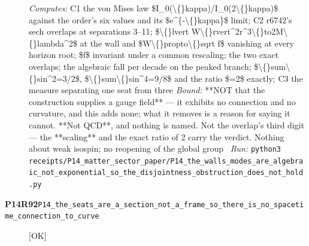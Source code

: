 \begin{description}
\emph{Computes:} C1 the von Mises law \$I\_0(\textbackslash\{\}kappa)/I\_0(2\textbackslash\{\}kappa)\$ against the order's six values and its \$e\textasciicircum{}\{-\textbackslash\{\}kappa\}\$ limit; C2 r6742's sech overlaps at separations 3--11; \$\textbackslash\{\}lvert W\textbackslash\{\}rvert\textasciicircum{}2r\textasciicircum{}3\textbackslash\{\}to2M\textbackslash\{\}lambda\textasciicircum{}2\$ at the wall and \$W\textbackslash\{\}propto\textbackslash\{\}sqrt f\$ vanishing at every horizon root; \$f\$ invariant under a common rescaling; the two exact overlaps; the algebraic fall per decade on the peaked branch; \$\textbackslash\{\}sum\textbackslash\{\}sin\textasciicircum{}2=3/2\$, \$\textbackslash\{\}sum\textbackslash\{\}sin\textasciicircum{}4=9/8\$ and the ratio \$=2\$ exactly; C3 the measure separating one seat from three
 \emph{Bound:}  **NOT that the construction supplies a gauge field** --- it exhibits no connection and no curvature, and this adds none; what it removes is a reason for saying it cannot. **Not QCD**, and nothing is named. Not the overlap's third digit --- the **scaling** and the exact ratio of 2 carry the verdict. Nothing about weak isospin; no reopening of the global group
\ \emph{Run:} \texttt{python3 receipts/P14\_matter\_sector\_paper/P14\_the\_walls\_modes\_are\_algebraic\_not\_exponential\_so\_the\_disjointness\_obstruction\_does\_not\_hold.py}
\item[\rcptlabel{P14_the_seats_are_a_section_not_a_frame_so_there_is_no_spacetime_connection_to_curve}{P14R92}\textbf{P14R92}\quad\texttt{P14\_the\_seats\_are\_a\_section\_not\_a\_frame\_so\_there\_is\_no\_spacetime\_connection\_to\_curve}]\hfill\textsf{[OK]}\\

\end{description}
